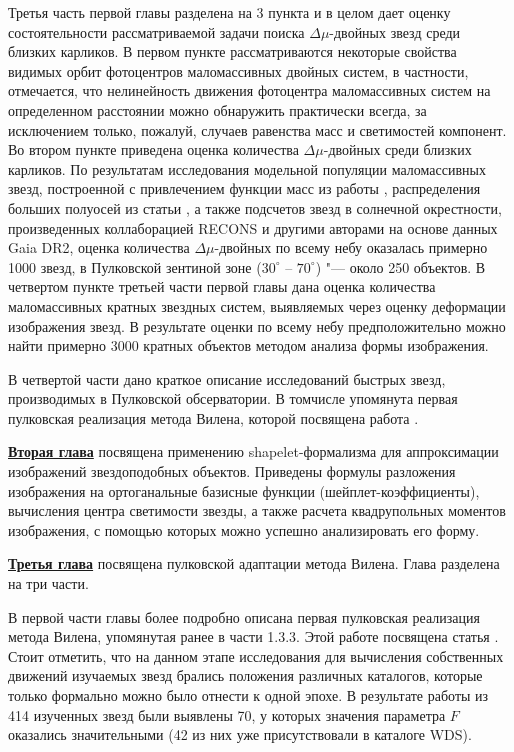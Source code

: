 Третья часть первой главы разделена на 3 пункта и в целом дает оценку состоятельности рассматриваемой задачи поиска $\Delta\mu$-двойных звезд среди близких карликов. В первом пункте рассматриваются некоторые свойства видимых орбит фотоцентров маломассивных двойных систем, в частности, отмечается, что нелинейность движения фотоцентра маломассивных систем на определенном расстоянии можно обнаружить практически всегда, за исключением только, пожалуй, случаев равенства масс и светимостей компонент. Во втором пункте приведена оценка количества $\Delta\mu$-двойных среди близких карликов. По результатам исследования модельной популяции маломассивных звезд, построенной с привлечением функции масс из работы \cite{2005ASSL..327...41C}, распределения больших полуосей из статьи \cite{2010ApJS..190....1R}, а также подсчетов звезд в солнечной окрестности, произведенных коллаборацией RECONS \cite{2019AJ....157..216W} и другими авторами на основе данных Gaia DR2, оценка количества $\Delta\mu$-двойных по всему небу оказалась примерно 1000 звезд, в Пулковской зентиной зоне ($30^\circ$ -- $70^\circ$) "--- около 250 объектов. В четвертом пункте третьей части первой главы дана оценка количества маломассивных кратных звездных систем, выявляемых через оценку деформации изображения звезд. В результате оценки по всему небу предположительно можно найти примерно 3000 кратных объектов методом анализа формы изображения.

В четвертой части дано краткое описание исследований быстрых звезд, производимых в Пулковской обсерватории. В томчисле упомянута первая пулковская реализация метода Вилена, которой посвящена работа \cite{2011AstL...37..420K}.

\underline{\textbf{Вторая глава}} посвящена применению shapelet-формализма для аппроксимации изображений звездоподобных объектов. Приведены формулы разложения изображения на ортоганальные базисные функции (шейплет-коэффициенты), вычисления центра светимости звезды, а также расчета квадрупольных моментов изображения, с помощью которых можно успешно анализировать его форму.

\underline{\textbf{Третья глава}} посвящена пулковской адаптации метода Вилена. Глава разделена на три части.

В первой части главы более подробно описана первая пулковская реализация метода Вилена, упомянутая ранее в части 1.3.3. Этой работе посвящена статья \cite{2011AstL...37..420K}. Стоит отметить, что на данном этапе исследования для вычисления собственных движений изучаемых звезд брались положения различных каталогов, которые только формально можно было отнести к одной эпохе. В результате работы из 414 изученных звезд были выявлены 70, у которых значения параметра $F$ оказались значительными (42 из них уже присутствовали в каталоге WDS).


